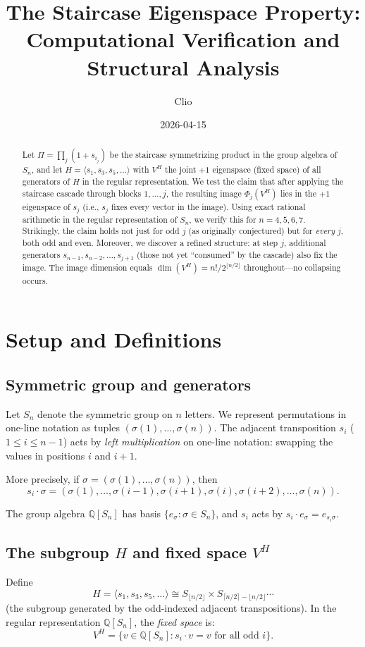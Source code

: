 \documentclass[12pt]{article}
\title{The Staircase Eigenspace Property:\\
Computational Verification and Structural Analysis}
\author{Clio}
\date{2026-04-15}
\theoremstyle{definition}
\begin{document}
\maketitle

\begin{abstract}
Let $\Pi = \prod_j (1 + s_{i_j})$ be the staircase symmetrizing product in the group algebra of $S_n$, and let $H = \langle s_1, s_3, s_5, \ldots \rangle$ with $V^H$ the joint $+1$ eigenspace (fixed space) of all generators of $H$ in the regular representation. We test the claim that after applying the staircase cascade through blocks $1, \ldots, j$, the resulting image $\Phi_j(V^H)$ lies in the $+1$ eigenspace of $s_j$ (i.e., $s_j$ fixes every vector in the image). Using exact rational arithmetic in the regular representation of $S_n$, we verify this for $n = 4, 5, 6, 7$. Strikingly, the claim holds not just for odd $j$ (as originally conjectured) but for \emph{every} $j$, both odd and even. Moreover, we discover a refined structure: at step $j$, additional generators $s_{n-1}, s_{n-2}, \ldots, s_{j+1}$ (those not yet ``consumed'' by the cascade) also fix the image. The image dimension equals $\dim(V^H) = n!/2^{\lfloor n/2 \rfloor}$ throughout---no collapsing occurs.
\end{abstract}

\section{Setup and Definitions}

\subsection{Symmetric group and generators}
Let $S_n$ denote the symmetric group on $n$ letters. We represent permutations in one-line notation as tuples $(\sigma(1), \ldots, \sigma(n))$. The adjacent transposition $s_i$ ($1 \le i \le n-1$) acts by \emph{left multiplication} on one-line notation: swapping the values in positions $i$ and $i+1$.

More precisely, if $\sigma = (\sigma(1), \ldots, \sigma(n))$, then
\[
  s_i \cdot \sigma = (\sigma(1), \ldots, \sigma(i-1), \sigma(i+1), \sigma(i), \sigma(i+2), \ldots, \sigma(n)).
\]

The group algebra $\mathbb{Q}[S_n]$ has basis $\{e_\sigma : \sigma \in S_n\}$, and $s_i$ acts by $s_i \cdot e_\sigma = e_{s_i \sigma}$.

\subsection{The subgroup $H$ and fixed space $V^H$}
Define
\[
  H = \langle s_1, s_3, s_5, \ldots \rangle \cong S_{\lfloor n/2 \rfloor} \times S_{\lceil n/2 \rceil - \lfloor n/2 \rfloor} \cdots
\]
(the subgroup generated by the odd-indexed adjacent transpositions). In the regular representation $\mathbb{Q}[S_n]$, the \emph{fixed space} is:
\[
  V^H = \{v \in \mathbb{Q}[S_n] : s_i \cdot v = v \text{ for all odd } i\}.
\]
\end{document}
